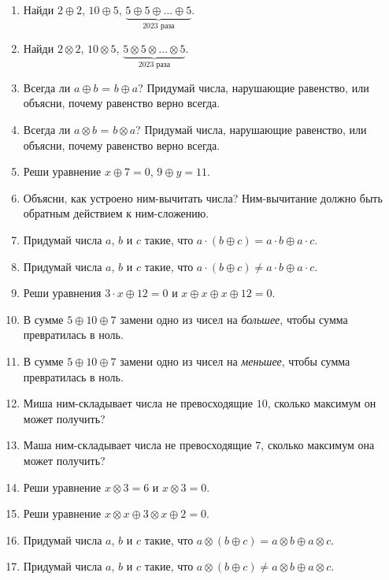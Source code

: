 \documentclass[12pt]{article}
\theoremstyle{definition}
\begin{document}
{\begin{enumerate}
  \item Найди $2 \oplus 2$, $10 \oplus 5$, $\underbrace{5 \oplus 5 \oplus \ldots \oplus 5}_{2023 \text{ раза}}$.
  \item Найди $2 \otimes 2$, $10 \otimes 5$, $\underbrace{5 \otimes 5 \otimes \ldots \otimes 5}_{2023 \text{ раза}}$.
  \item Всегда ли $a \oplus b$ = $b \oplus a$? 
  Придумай числа, нарушающие равенство, или объясни, почему равенство верно всегда. 
  \item Всегда ли $a \otimes b$ = $b \otimes a$? 
  Придумай числа, нарушающие равенство, или объясни, почему равенство верно всегда. 
  \item Реши уравнение $x \oplus 7 = 0$, $9 \oplus y = 11$. 
  \item Объясни, как устроено ним-вычитать числа? 
  Ним-вычитание должно быть обратным действием к ним-сложению.
  \item Придумай числа $a$, $b$ и $c$ такие, что $a\cdot (b\oplus c) = a\cdot b \oplus a\cdot c$.
  \item Придумай числа $a$, $b$ и $c$ такие, что $a\cdot (b\oplus c) \neq a\cdot b \oplus a\cdot c$.
  \item Реши уравнения $3\cdot x \oplus 12 = 0$ и $x \oplus x \oplus x \oplus 12 = 0$.
  \item В сумме $5 \oplus 10 \oplus 7$ замени одно из чисел на \textit{большее}, чтобы сумма превратилась в ноль.
  \item В сумме $5 \oplus 10 \oplus 7$ замени одно из чисел на \textit{меньшее}, чтобы сумма превратилась в ноль.
  \item Миша ним-складывает числа не превосходящие $10$, сколько максимум он может получить?
  \item Маша ним-складывает числа не превосходящие $7$, сколько максимум она может получить?
  \item Реши уравнение $x \otimes 3 = 6$ и $x \otimes 3 = 0$.
  \item Реши уравнение $x \otimes x \oplus 3 \otimes x \oplus 2 = 0$.
  \item Придумай числа $a$, $b$ и $c$ такие, что $a\otimes (b\oplus c) = a\otimes b \oplus a\otimes c$.
  \item Придумай числа $a$, $b$ и $c$ такие, что $a\otimes (b\oplus c) \neq a\otimes b \oplus a\otimes c$.
\end{enumerate}
}

\newpage
\nim
\newpage
\nim
\end{document}
